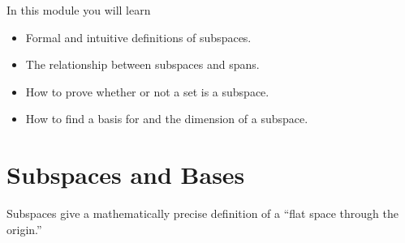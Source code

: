 	\begin{bookonly}\singlegrid\end{bookonly}

\begin{module}

	In this module you will learn
	\begin{itemize}
		\item Formal and intuitive definitions of subspaces.
		\item The relationship between subspaces and spans.
		\item How to prove whether or not a set is a subspace.
		\item How to find a basis for and the dimension of a subspace.
	\end{itemize}

	
	
\end{module}
	\bookonlynewpage
\section*{Subspaces and Bases}
	\vspace{-1em}

	Subspaces give a mathematically precise definition of a ``flat space through the origin.''

